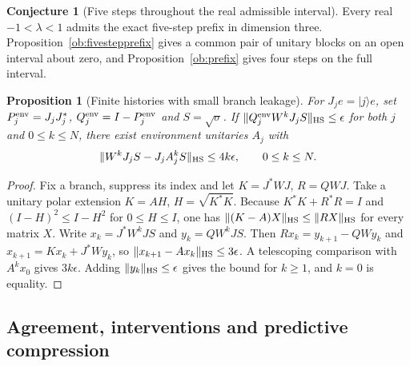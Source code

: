 \documentclass[aps,pra,onecolumn,superscriptaddress,nofootinbib,10pt]{revtex4-2}
\newtheorem{proposition}[theorem]{Proposition}
\theoremstyle{definition}
\newtheorem{conjecture}[theorem]{Conjecture}
\theoremstyle{remark}
\begin{document}
\begin{conjecture}[Five steps throughout the real admissible interval]
\label{ob:prefixconjecture}
Every real \(-1<\lambda<1\) admits the exact five-step prefix in
dimension three. Proposition~\ref{ob:fivestepprefix} gives a common
pair of unitary blocks on an open interval about zero, and
Proposition~\ref{ob:prefix} gives four steps on the full interval.
\end{conjecture}

\begin{proposition}[Finite histories with small branch leakage]\label{ob:leakage}
For $J_j e=|j\rangle e$, set $P_j^{\rm env}=J_jJ_j^*$,
$Q_j^{\rm env}=I-P_j^{\rm env}$ and $S=\sqrt{\sigma}$.
If $\|Q_j^{\rm env}W^kJ_jS\|_{\rm HS}\le\epsilon$ for both
$j$ and $0\le k\le N$, there exist environment unitaries $A_j$ with
\[
 \|W^kJ_jS-J_j A_j^kS\|_{\rm HS}\le4k\epsilon,\qquad 0\le k\le N .
\]
\end{proposition}
\begin{proof}
Fix a branch, suppress its index and let $K=J^*WJ$, $R=QWJ$.
Take a unitary polar extension $K=AH$, $H=\sqrt{K^*K}$.
Because $K^*K+R^*R=I$ and $(I-H)^2\le I-H^2$ for
$0\le H\le I$, one has $\|(K-A)X\|_{\rm HS}\le\|RX\|_{\rm HS}$
for every matrix $X$. Write $x_k=J^*W^kJS$ and $y_k=QW^kJS$.
Then $Rx_k=y_{k+1}-QWy_k$ and
$x_{k+1}=Kx_k+J^*Wy_k$, so
$\|x_{k+1}-Ax_k\|_{\rm HS}\le3\epsilon$.
A telescoping comparison with $A^kx_0$ gives $3k\epsilon$.
Adding $\|y_k\|_{\rm HS}\le\epsilon$ gives the bound for $k\ge1$,
and $k=0$ is equality.
\end{proof}

\subsection{Agreement, interventions and predictive compression}\label{ob:agreement}
\end{document}
